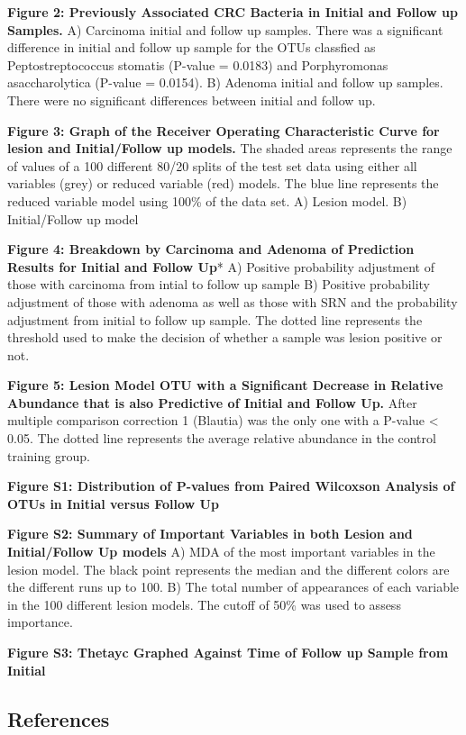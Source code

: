 \documentclass[12pt,]{article}
\begin{document}
\textbf{Figure 2: Previously Associated CRC Bacteria in Initial and
Follow up Samples.} A) Carcinoma initial and follow up samples. There
was a significant difference in initial and follow up sample for the
OTUs classfied as Peptostreptococcus stomatis (P-value = 0.0183) and
Porphyromonas asaccharolytica (P-value = 0.0154). B) Adenoma initial and
follow up samples. There were no significant differences between initial
and follow up.

\textbf{Figure 3: Graph of the Receiver Operating Characteristic Curve
for lesion and Initial/Follow up models.} The shaded areas represents
the range of values of a 100 different 80/20 splits of the test set data
using either all variables (grey) or reduced variable (red) models. The
blue line represents the reduced variable model using 100\% of the data
set. A) Lesion model. B) Initial/Follow up model

\textbf{Figure 4: Breakdown by Carcinoma and Adenoma of Prediction
Results for Initial and Follow Up}* A) Positive probability adjustment
of those with carcinoma from intial to follow up sample B) Positive
probability adjustment of those with adenoma as well as those with SRN
and the probability adjustment from initial to follow up sample. The
dotted line represents the threshold used to make the decision of
whether a sample was lesion positive or not.

\textbf{Figure 5: Lesion Model OTU with a Significant Decrease in
Relative Abundance that is also Predictive of Initial and Follow Up.}
After multiple comparison correction 1 (Blautia) was the only one with a
P-value \textless{} 0.05. The dotted line represents the average
relative abundance in the control training group.

\newpage

\textbf{Figure S1: Distribution of P-values from Paired Wilcoxson
Analysis of OTUs in Initial versus Follow Up}

\textbf{Figure S2: Summary of Important Variables in both Lesion and
Initial/Follow Up models} A) MDA of the most important variables in the
lesion model. The black point represents the median and the different
colors are the different runs up to 100. B) The total number of
appearances of each variable in the 100 different lesion models. The
cutoff of 50\% was used to assess importance.

\textbf{Figure S3: Thetayc Graphed Against Time of Follow up Sample from
Initial}

\newpage

\subsection*{References}\label{references}
\end{document}
